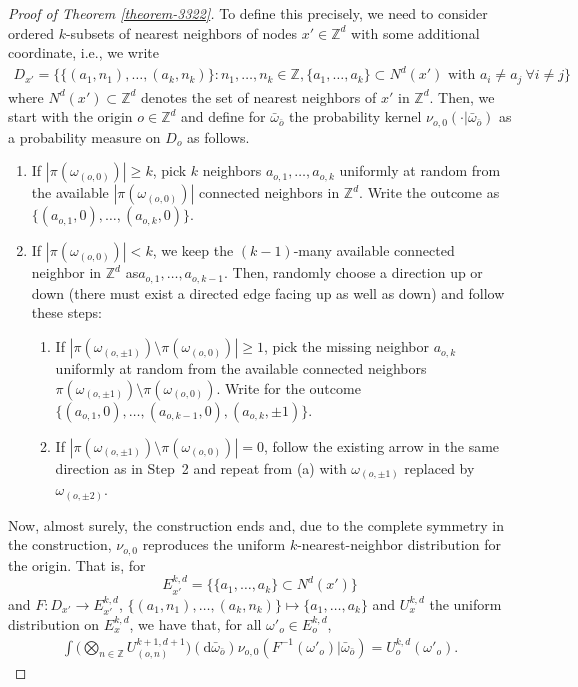 \documentclass[a4paper, oneside, 11pt]{amsart}
\theoremstyle{definition}
\newcommand{\1}{\mathbbm{1}}
\newcommand{\0}{\mathbf{o}}
\renewcommand{\d}{\mathrm{d}}
\newcommand{\Z}{\mathbb{Z}}
\numberwithin{equation}{section}
\begin{document}
\begin{proof}[Proof of Theorem \ref{theorem-3322}]
To define this precisely, we need to consider ordered $k$-subsets of nearest neighbors of nodes $x'\in \Z^d$ with some additional coordinate, i.e., we write 
\begin{align*}
D_{x'}
=
\{\{(a_{1},n_1),\dots,(a_{k},n_k)\}\colon n_1,\dots,n_k\in \Z, \{a_1,\dots,a_k\}
\subset N^d(x')\text{ with }a_i\neq a_j \ \forall i\neq j\}
\end{align*}
where $N^d(x')\subset\Z^d$ denotes the set of nearest neighbors of $x'$ in $\Z^d$.
Then, we start with the origin $o\in \Z^d$ and define for $\bar\omega_{\bar o}$ the probability kernel $\nu_{o,0}(\cdot|\bar\omega_{\bar o})$ as a probability measure on $D_o$ as follows. 
\begin{enumerate}
\item[\bf Step 1] If $|\pi(\omega_{(o,0)})|\ge k$, pick $k$ neighbors $a_{o,1},\dots,a_{o,k}$ uniformly at random from the available $|\pi(\omega_{(o,0)})|$ connected neighbors in $\Z^d$. Write the outcome as $\big\{(a_{o,1},0),\dots,(a_{o,k},0)\big\}$.
\item[\bf Step 2] If $|\pi(\omega_{(o,0)})|<k$, we keep the $(k-1)$-many available connected neighbor in $\Z^d$ as\linebreak $a_{o,1},\dots, a_{o,k-1}$. Then, randomly choose a direction up or down (there must exist a directed edge facing up as well as down) and follow these steps:
\begin{enumerate}
\item If $|\pi(\omega_{(o,\pm 1)})\setminus \pi(\omega_{(o,0)})|\ge 1$, 
pick the missing neighbor $a_{o,k}$ uniformly at random from the available connected neighbors $\pi(\omega_{(o,\pm 1)})\setminus \pi(\omega_{(o,0)})$. Write for the outcome $\big\{(a_{o,1},0),\dots,(a_{o,k-1},0),(a_{o,k},\pm 1)\big\}$.
\item If $|\pi(\omega_{(o,\pm 1)})\setminus \pi(\omega_{(o,0)})|= 0$, follow the existing arrow in the same direction as in Step~2 and repeat from (a) with $\omega_{(o,\pm 1)}$ replaced by $\omega_{(o,\pm 2)}$.
\end{enumerate}
\end{enumerate}
Now, almost surely, the construction ends and, due to the complete symmetry in the construction, $\nu_{o,0}$ reproduces the uniform $k$-nearest-neighbor distribution for the origin. That is, for 
$$E^{k,d}_{x'}=\{\{a_1,\dots, a_k\}\subset N^d(x')\}$$ 
and $F\colon D_{x'}\to E^{k,d}_{x'}$, $\big\{(a_1,n_1),\dots,(a_k,n_k)\big\}\mapsto \{a_1,\dots, a_k\}$ and $U^{k,d}_x$ the uniform distribution on $E^{k,d}_x$, we have that, for all $\omega'_o\in E^{k,d}_o$,
\begin{align*}
\int \Big(\bigotimes_{n\in \Z}U^{k+1,d+1}_{(o,n)}\Big)(\d \bar \omega_{\bar o})\nu_{o,0}(F^{-1}(\omega'_o)|\bar\omega_{\bar o})=U^{k,d}_o(\omega'_o).
\end{align*}


\end{proof}
\end{document}
